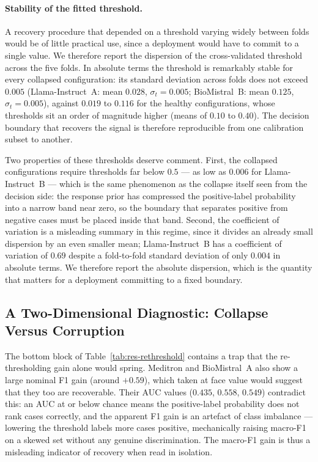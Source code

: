 \paragraph{Stability of the fitted threshold.} A recovery procedure that 
depended on a threshold varying widely between folds would be of little 
practical use, since a deployment would have to commit to a single value. 
We therefore report the dispersion of the cross-validated threshold 
across the five folds. In absolute terms the threshold is remarkably 
stable for every collapsed configuration: its standard deviation across 
folds does not exceed $0.005$ (Llama-Instruct~A: mean $0.028$, 
$\sigma_t = 0.005$; BioMistral~B: mean $0.125$, $\sigma_t = 0.005$), 
against $0.019$ to $0.116$ for the healthy configurations, whose 
thresholds sit an order of magnitude higher (means of $0.10$ to $0.40$). 
The decision boundary that recovers the signal is therefore reproducible 
from one calibration subset to another.

Two properties of these thresholds deserve comment. First, the collapsed 
configurations require thresholds far below $0.5$ --- as low as $0.006$ 
for Llama-Instruct~B --- which is the same phenomenon as the collapse 
itself seen from the decision side: the response prior has compressed the 
positive-label probability into a narrow band near zero, so the boundary 
that separates positive from negative cases must be placed inside that 
band. Second, the coefficient of variation is a misleading summary in 
this regime, since it divides an already small dispersion by an even 
smaller mean; Llama-Instruct~B has a coefficient of variation of $0.69$ 
despite a fold-to-fold standard deviation of only $0.004$ in absolute 
terms. We therefore report the absolute dispersion, which is the quantity 
that matters for a deployment committing to a fixed boundary.

\subsection{A Two-Dimensional Diagnostic: Collapse Versus Corruption}
\label{subsec:res-rethreshold-diag}

The bottom block of Table~\ref{tab:res-rethreshold} contains a trap that 
the re-thresholding gain alone would spring. Meditron and BioMistral~A 
also show a large nominal F1 gain (around $+0.59$), which taken at face 
value would suggest that they too are recoverable. Their AUC values 
($0.435$, $0.558$, $0.549$) contradict this: an AUC at or below chance 
means the positive-label probability does not rank cases correctly, and 
the apparent F1 gain is an artefact of class imbalance --- lowering the 
threshold labels more cases positive, mechanically raising macro-F1 on a 
skewed set without any genuine discrimination. The macro-F1 gain is thus 
a misleading indicator of recovery when read in isolation.

